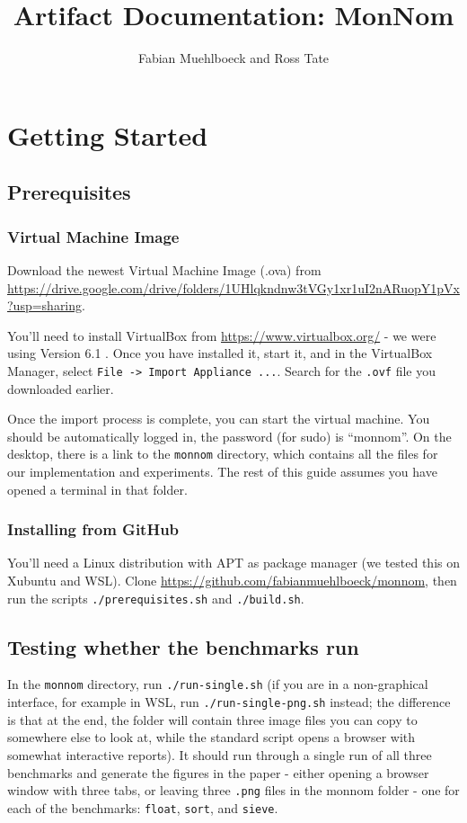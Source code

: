 \documentclass{article}
\title{Artifact Documentation: MonNom}
\author{Fabian Muehlboeck and Ross Tate}
\begin{document}
\maketitle
\section{Getting Started}

\subsection{Prerequisites}

\subsubsection{Virtual Machine Image}
Download the newest Virtual Machine Image (.ova) from \url{https://drive.google.com/drive/folders/1UHlqkndnw3tVGy1xr1uI2nARuopY1pVx?usp=sharing}.

You'll need to install VirtualBox from \url{https://www.virtualbox.org/} - we were using Version 6.1 .
Once you have installed it, start it, and in the VirtualBox Manager, select \texttt{File -> Import Appliance ...}.
Search for the \texttt{.ovf} file you downloaded earlier.

Once the import process is complete, you can start the virtual machine.
You should be automatically logged in, the password (for sudo) is ``monnom''.
On the desktop, there is a link to the \texttt{monnom} directory, which contains all the files for our implementation and experiments.
The rest of this guide assumes you have opened a terminal in that folder.

\subsubsection{Installing from GitHub}
You'll need a Linux distribution with APT as package manager (we tested this on Xubuntu and WSL).
Clone \url{https://github.com/fabianmuehlboeck/monnom}, then run the scripts \texttt{./prerequisites.sh} and \texttt{./build.sh}.

\subsection{Testing whether the benchmarks run}
In the \texttt{monnom} directory, run \texttt{./run-single.sh} (if you are in a non-graphical interface, for example in WSL, run \texttt{./run-single-png.sh} instead; the difference is that at the end, the folder will contain three image files you can copy to somewhere else to look at, while the standard script opens a browser with somewhat interactive reports).
It should run through a single run of all three benchmarks and generate the figures in the paper - either opening a browser window with three tabs, or leaving three \texttt{.png} files in the monnom folder - one for each of the benchmarks: \texttt{float}, \texttt{sort}, and \texttt{sieve}.
\end{document}
